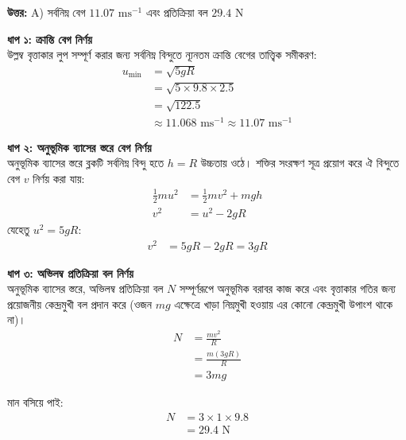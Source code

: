 \documentclass[12pt, a4paper]{article}
\begin{document}
\vspace{0.5em}
\begin{tcolorbox}[answerbox]
    \textbf{\color{success} উত্তর:} A) সর্বনিম্ন বেগ $11.07\text{ ms}^{-1}$ এবং প্রতিক্রিয়া বল $29.4\text{ N}$
\end{tcolorbox}
\vspace{1em}

\begin{tcolorbox}[solutionbox={সমাধান (Solution)}]
    \noindent
    \textbf{ধাপ ১: ক্রান্তি বেগ নির্ণয়} \\
    উল্লম্ব বৃত্তাকার লুপ সম্পূর্ণ করার জন্য সর্বনিম্ন বিন্দুতে ন্যূনতম ক্রান্তি বেগের তাত্ত্বিক সমীকরণ:
    \begin{align*}
        u_{\min} &= \sqrt{5gR} \\
        &= \sqrt{5 \times 9.8 \times 2.5} \\
        &= \sqrt{122.5} \\
        &\approx 11.068\text{ ms}^{-1} \approx \mathbf{11.07}\text{ ms}^{-1}
    \end{align*}
    
    \vspace{0.5em}
    \noindent\textbf{ধাপ ২: অনুভূমিক ব্যাসের স্তরে বেগ নির্ণয়} \\
    অনুভূমিক ব্যাসের স্তরে ব্লকটি সর্বনিম্ন বিন্দু হতে $h = R$ উচ্চতায় ওঠে। শক্তির সংরক্ষণ সূত্র প্রয়োগ করে ঐ বিন্দুতে বেগ $v$ নির্ণয় করা যায়:
    \begin{align*}
        \frac{1}{2} m u^2 &= \frac{1}{2} m v^2 + m g h \\
        v^2 &= u^2 - 2gR
    \end{align*}
    যেহেতু $u^2 = 5gR$:
    \begin{align*}
        v^2 &= 5gR - 2gR = 3gR
    \end{align*}
    
    \vspace{0.5em}
    \noindent\textbf{ধাপ ৩: অভিলম্ব প্রতিক্রিয়া বল নির্ণয়} \\
    অনুভূমিক ব্যাসের স্তরে, অভিলম্ব প্রতিক্রিয়া বল $N$ সম্পূর্ণরূপে অনুভূমিক বরাবর কাজ করে এবং বৃত্তাকার গতির জন্য প্রয়োজনীয় কেন্দ্রমুখী বল প্রদান করে (ওজন $mg$ এক্ষেত্রে খাড়া নিম্নমুখী হওয়ায় এর কোনো কেন্দ্রমুখী উপাংশ থাকে না)।
    \begin{align*}
        N &= \frac{m v^2}{R} \\
          &= \frac{m (3gR)}{R} \\
          &= 3mg
    \end{align*}
    
    মান বসিয়ে পাই:
    \begin{align*}
        N &= 3 \times 1 \times 9.8 \\
          &= \mathbf{29.4}\text{ N}
    \end{align*}
\end{tcolorbox}
\end{document}
